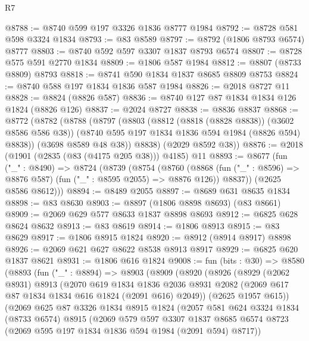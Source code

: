 \begin{lexlean}{R7}
\begin{coremodule}
@8788 := @8740 @599 @197 @3326 @1836 @8777 @1984
@8792 := @8728 @581 @598 @3324 @1834
@8793 := @83 @8589
@8797 := @8792 (@1806 @8793 @6574) @8777
@8803 := @8740 @592 @597 @3307 @1837 @8793 @6574
@8807 := @8728 @575 @591 @2770 @1834
@8809 := @1806 @587 @1984
@8812 := @8807 (@8733 @8809) @8793
@8818 := @8741 @590 @1834 @1837 @8685 @8809 @8753
@8824 := @8740 @588 @197 @1834 @1836 @587 @1984
@8826 := @2018 @8727 @11
@8828 := @8824 (@8826 @587)
@8836 := @8740 @127 @87 @1834 @1834 @126 @1824 (@8826 @126)
@8837 := @2024 @8727
@8838 := @8836 @8837
@8868 := @8772
    (@8782
      (@8788
        (@8797
          (@8803
            (@8812 (@8818 (@8828 @8838)) (@3602 @8586 @586 @38))
            (@8740 @595 @197 @1834 @1836 @594 @1984 (@8826 @594) @8838))
          (@3698 @8589 @48 @38))
        @8838)
      (@2029 @8592 @38))
@8876 := @2018 (@1901 (@2835 (@83 (@4175 @205 @38))) @4185) @11
@8893 := @8677
    (fun ("_" : @8490) =>
    @8724
      (@8739
        (@8754
          (@8760
            (@8868 (fun ("_" : @8596) => @8876 @587) (fun ("_" : @8595 @2055) => @8876 @126))
            @8837))
        (@2625 @8586 @8612)))
@8894 := @8489 @2055
@8897 := @8689 @631 @8635 @1834
@8898 := @83 @8630
@8903 := @8897 (@1806 @8898 @8693) (@83 @8661)
@8909 := @2069 @629 @577 @8633 @1837 @8898 @8693
@8912 := @6825 @628 @8624 @8632
@8913 := @83 @8619
@8914 := @1806 @8913
@8915 := @83 @8629
@8917 := @1806 @8915 @1824
@8920 := @8912 (@8914 @8917) @8898
@8926 := @2069 @621 @627 @8622 @8538 @8913 @8917
@8929 := @6825 @620 @1837 @8621
@8931 := @1806 @616 @1824
@9008 := fun (bits : @30) =>
  @8580
    (@8893
      (fun ("_" : @8894) =>
      @8903
        (@8909
          (@8920
            (@8926
              (@8929
                (@2062 @8931)
                @8913
                (@2070
                  @619
                  @1834
                  @1836
                  @2036
                  @8931
                  @2082
                  (@2069 @617 @87 @1834 @1834 @616 @1824 (@2091 @616) @2049))
                (@2625 @1957 @615))
              (@2069
                @625
                @87
                @3326
                @1834
                @8915
                @1824
                (@2057
                  @581
                  @624
                  @3324
                  @1834
                  (@8733 @6574)
                  @8915
                  (@2069
                    @579
                    @597
                    @3307
                    @1837
                    @8685
                    @6574
                    @8723
                    (@2069 @595 @197 @1834 @1836 @594 @1984 (@2091 @594) @8717))

\end{coremodule}
\end{lexlean}
